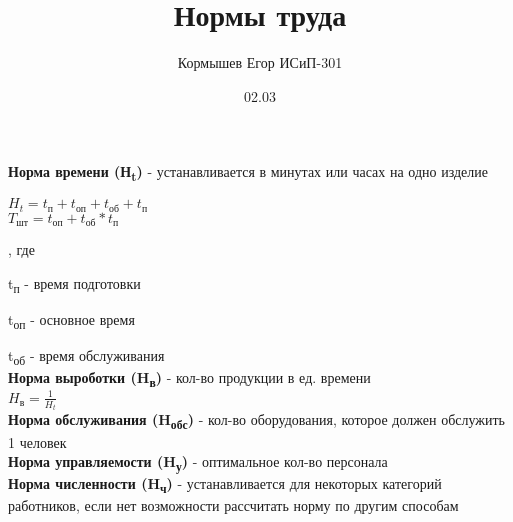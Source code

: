 \documentclass[11pt]{article}
\author{Кормышев Егор ИСиП-301}
\date{02.03}
\title{Нормы труда}
\begin{document}
\maketitle
\tableofcontents

\textbf{Норма времени (Н\textsubscript{t})} - устанавливается в минутах или часах на одно изделие

$H_t = t_\text{п} + t_\text{оп} + t_\text{об} + t_\text{п}$ \\
$T_\text{шт} = t_\text{оп} + t_\text{об} * t_\text{п}$

, где

t\textsubscript{п} - время подготовки

t\textsubscript{оп} - основное время

t\textsubscript{об} - время обслуживания \\[0pt]

\textbf{Норма выроботки (H\textsubscript{в})} - кол-во продукции в ед. времени \\[0pt]

\begin{math}
H_\text{в} = \frac{1}{H_t}
\end{math}
\\[0pt]

\textbf{Норма обслуживания (H\textsubscript{обс})} - кол-во оборудования, которое должен обслужить 1 человек \\[0pt]

\textbf{Норма управляемости (H\textsubscript{у})} - оптимальное кол-во персонала \\[0pt]

\textbf{Норма численности (H\textsubscript{ч})} - устанавливается для некоторых категорий работников, если нет возможности рассчитать норму по другим способам
\end{document}
